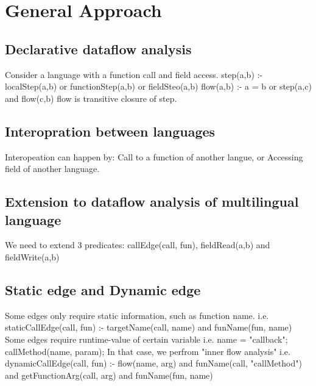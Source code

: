 \section{General Approach}

\subsection{Declarative dataflow analysis}
Consider a language with a function call and field access.
step(a,b) :- localStep(a,b) or functionStep(a,b) or fieldSteo(a,b)
flow(a,b) :- a = b or step(a,c) and flow(c,b)
flow is transitive closure of step.

\subsection{Interopration between languages}
Interopeation can happen by:
Call to a function of another langue, or Accessing field of another language.

\subsection{Extension to dataflow analysis of multilingual language}
We need to extend 3 predicates: callEdge(call, fun), fieldRead(a,b) and fieldWrite(a,b)

\subsection{Static edge and Dynamic edge}
Some edges only require static information, such as function name.
i.e. staticCallEdge(call, fun) :- targetName(call, name) and funName(fun, name)
Some edges require runtime-value of certain variable
i.e.
name = "callback";
callMethod(name, param);
In that case, we perfrom "inner flow analysis"
i.e.
dynamicCallEdge(call, fun) :- flow(name, arg) and funName(call, "callMethod") and
getFunctionArg(call, arg) and funName(fun, name)
